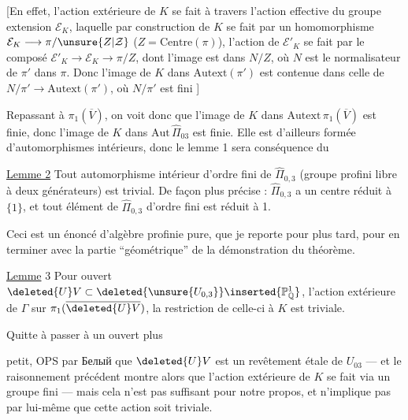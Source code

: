 
[En effet, l'action extérieure de $K$ se fait à travers l'action effective du groupe extension $\mathcal E_K$, laquelle par construction de $K$ se fait par un homomorphisme $\mathcal E_K\longrightarrow\pi/\unsure{Z|\mathcal Z}$ ($Z=\mathrm{Centre}(\pi)$),  l'action de $\mathcal E'_K$  se fait par le composé $\mathcal E'_K\longrightarrow\mathcal E_K\longrightarrow\pi/Z$, dont l'image est dans $N/Z$, où $N$ est le normalisateur de $\pi'$ dans $\pi$. Donc l'image de $K$ dans $\mathrm{Autext}(\pi')$ est contenue dans celle de $N/\pi'\longrightarrow\mathrm{Autext}(\pi')$, où $N/\pi'$ est fini ]


Repassant à $\pi_1(\overline V)$, on voit donc que l'image de $K$ dans $\mathrm{Autext}\,\pi_1(\overline V)$ est finie, donc l'image de $K$ dans $\mathrm{Aut}\,\widehat{\Pi}_{03}$ est finie. Elle est d'ailleurs formée d'automorphismes intérieurs, donc le lemme 1 sera conséquence du

\uline{Lemme 2} Tout automorphisme intérieur d'ordre fini de $\widehat{\Pi}_{0,3}$ (groupe profini libre à deux générateurs) est trivial. De façon plus précise : $\widehat{\Pi}_{0,3}$ a un centre réduit à $\{1\}$, et tout élément de $\widehat{\Pi}_{0,3}$ d'ordre fini est réduit à 1.

Ceci est un énoncé d'algèbre profinie pure, que je reporte pour plus tard, pour en terminer avec la partie ``géométrique'' de la démonstration du théorème.

\uline{Lemme} 3 Pour  ouvert  $\deleted{U}V\subset\deleted{\unsure{U_{0,3}}}\inserted{\mathbb P^1_{\mathbb Q}}$,  l'action extérieure de $\Gamma$ sur $\pi_1(\overline{\deleted{U}V})$, la restriction de celle-ci à $K$ est triviale.

Quitte à passer à un ouvert plus


petit, OPS par Белый que $\deleted{U}V$ est un revêtement étale de $U_{03}$ --- et le raisonnement précédent montre alors que l'action extérieure de $K$ se fait via un groupe  fini --- mais cela n'est pas suffisant pour notre propos, et n'implique pas par lui-même que cette action soit triviale.

